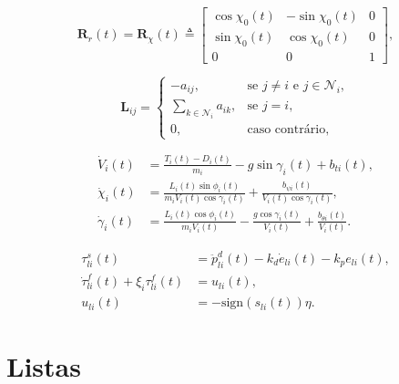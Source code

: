 \newcommand{\vt}[1]{\mathbf{#1}}

\begin{equation}\label{eq:R_f_usual}
\vt{R}_r(t) = \vt{R}_{\chi}(t) \triangleq 
\begin{bmatrix}
\cos \chi_0 (t) & -\sin \chi_0 (t) & 0
\\
\sin \chi_0 (t) & \cos \chi_0 (t) & 0
\\
0 & 0 & 1
\end{bmatrix},
\end{equation}

\begin{equation}
\vt{L}_{ij} = 
\begin{cases}
-a_{ij}, & \text{se } j \neq i \text{ e } j \in \mathcal{N}_i, \\
\sum_{k \in \mathcal{N}_i} a_{ik}, & \text{se } j = i,  \\
0, & \text{caso contrário},
\end{cases}
\end{equation}

\begin{equation}\label{eq:point-mass-velocity}
\begin{split}
\dot{V}_{i}(t) &{}= \frac{T_{i}(t) - D_i(t)}{m_i} - g \sin \gamma_{i}(t) + b_{ti}(t), \\
\dot{\chi}_i(t) &{}= \frac{L_i(t) \sin \phi_i(t)}{m_i V_{i}(t) \cos \gamma_{i}(t)} + \frac{b_{\psi i}(t)}{V_{i}(t)\cos \gamma_{i}(t)}, \\
\dot{\gamma}_{i}(t) &{}= \frac{L_i(t) \cos \phi_i(t)}{m_i V_{i}(t)} - \frac{g \cos \gamma_{i}(t)}{V_{i}(t)} + \frac{b_{\theta i}(t)}{V_{i}(t)}.
\end{split}
\end{equation}


\begin{subequations}
\begin{align}
\tau_{li}^s(t) &= \ddot{p}^d_{li}(t) - k_{d} \dot{e}_{li}(t) - k_{p} e_{li}(t), \\
\dot{\tau}_{li}^f(t) +  \xi_{i} \tau_{li}^f(t) &= u_{li}(t),\label{eq:filtro_i} \\
u_{li}(t) &= - \textrm{sign}(s_{li}(t))\eta. \label{eq:u_xbi}
\end{align}
\end{subequations}

\section{Listas}

